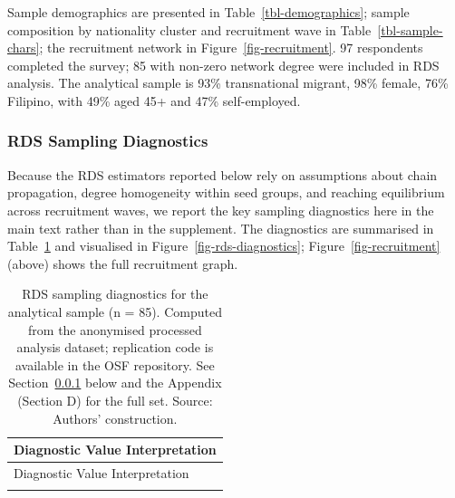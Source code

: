 \documentclass[
  12pt,
  letterpaper,
  DIV=11,
  numbers=noendperiod]{scrartcl}
\begin{document}
Sample demographics are presented in Table~\ref{tbl-demographics};
sample composition by nationality cluster and recruitment wave in
Table~\ref{tbl-sample-chars}; the recruitment network in
Figure~\ref{fig-recruitment}. 97 respondents completed the survey; 85
with non-zero network degree were included in RDS analysis. The
analytical sample is 93\% transnational migrant, 98\% female, 76\%
Filipino, with 49\% aged 45+ and 47\% self-employed.

\subsubsection{RDS Sampling Diagnostics}\label{sec-rds-diagnostics}

Because the RDS estimators reported below rely on assumptions about
chain propagation, degree homogeneity within seed groups, and reaching
equilibrium across recruitment waves, we report the key sampling
diagnostics here in the main text rather than in the supplement. The
diagnostics are summarised in Table~\ref{tbl-rds-diagnostics} and
visualised in Figure~\ref{fig-rds-diagnostics};
Figure~\ref{fig-recruitment} (above) shows the full recruitment graph.

\begin{longtable}[]{@{}
  >{\raggedright\arraybackslash}p{}@{}}
\caption{RDS sampling diagnostics for the analytical sample (n = 85).
Computed from the anonymised processed analysis dataset; replication
code is available in the OSF repository. See
Section~\ref{sec-rds-diagnostics} below and the Appendix (Section D) for
the full set. Source: Authors'
construction.}\label{tbl-rds-diagnostics}\tabularnewline
\toprule\noalign{}
\begin{minipage}[b]{\linewidth}\raggedright
Diagnostic \textbar{} Value \textbar{} Interpretation
\end{minipage} \\
\midrule\noalign{}
\endfirsthead
\toprule\noalign{}
\begin{minipage}[b]{\linewidth}\raggedright
Diagnostic \textbar{} Value \textbar{} Interpretation
\end{minipage} \\
\midrule\noalign{}
\endhead
\bottomrule\noalign{}
\endlastfoot
\end{longtable}
\end{document}
